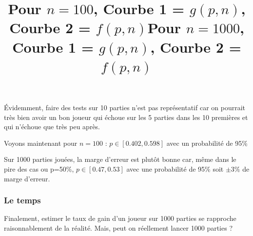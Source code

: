 \documentclass{report}
\begin{document}
Évidemment, faire des tests sur 10 parties n'est pas représentatif car on pourrait très bien avoir un bon joueur qui échoue sur les 5 parties dans les 10 premières et qui n'échoue que très peu après.\newline

\begin{center}
\begin{center}
    \title{Pour $n=100$, Courbe 1 = $g(p,n)$, Courbe 2 = $f(p,n)$}
\end{center}
\end{center}

Voyons maintenant pour $n=100$ : $p\in[0.402,0.598]$ avec un probabilité de 95\%\newline

\begin{center}
\begin{center}
    \title{Pour $n=1000$, Courbe 1 = $g(p,n)$, Courbe 2 = $f(p,n)$}
\end{center}
\end{center}

Sur 1000 parties jouées, la marge d'erreur est plutôt bonne car, même dans le pire des cas ou p=50\%, $p\in[0.47,0.53]$ avec une probabilité de 95\% soit $\pm3\%$ de marge d'erreur.\newline

\subsubsection{Le temps}

Finalement, estimer le taux de gain d'un joueur sur 1000 parties se rapproche raisonnablement de la réalité. Mais, peut on réellement lancer 1000 parties ?
\end{document}
